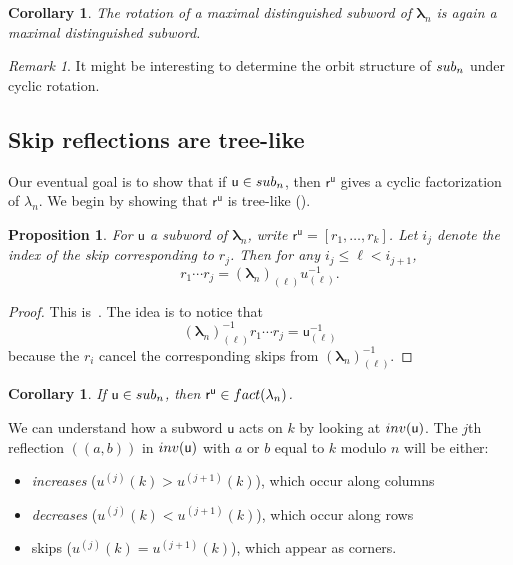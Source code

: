 \documentclass[a4paper,10pt,leqno]{amsart}
\newcommand{\darkred}{\color{darkred}}
\numberwithin{equation}{section}
\newtheorem{proposition}[theorem]{Proposition}
\newtheorem{corollary}[theorem]{Corollary}
\theoremstyle{definition}
\theoremstyle{remark}
\newtheorem{remark}[theorem]{Remark}
\renewcommand{\u}{\mathsf{u}}
\renewcommand{\S}{\textsc{sub}}
\newcommand{\Fact}{\textsc{fact}}
\newcommand{\Inv}{\textsc{inv}}
\newcommand{\rr}{\mathsf{r}}
\newcommand{\rru}{\rr^\u}
\newcommand{\rrr}{r}
\newcommand{\blambda}{\bm{\lambda}}
\newcommand{\defn}[1]{\emph{\darkred #1}}
\begin{document}
\begin{corollary}
    The rotation of a maximal distinguished subword of $\blambda_n$ is again a maximal distinguished subword.
\end{corollary}
\begin{remark}
It might be interesting to determine the orbit structure of $\S_n$ under cyclic rotation.
\end{remark}

\subsection{Skip reflections are tree-like}
Our eventual goal is to show that if $\u \in \S_n$, then $\rru$ gives a cyclic factorization of $\lambda_n$.  We begin by showing that $\rru$ is tree-like ().

 \begin{proposition}
\label{invProd}
    For $\u$ a subword of $\blambda_n$, write $\rru = \left[\rrr_1,\dots,\rrr_{k}\right]$.  Let $i_j$ denote the index of the skip corresponding to $\rrr_j$. Then for any $i_j \leq \ell < i_{j+1}$,
    \[
        \rrr_1 \cdots \rrr_{j} = (\blambda_n)_{(\ell)} u_{(\ell)}^{-1}.
    \]
\end{proposition}
\begin{proof}
    This is~\cite[Proposition 4.7]{galashin2022rational}.  The idea is to notice that \[(\blambda_n)_{(\ell)}^{-1}\rrr_1\cdots \rrr_{j} = \u_{(\ell)}^{-1}\] because the $\rrr_i$ cancel the corresponding skips from $(\blambda_n)_{(\ell)}^{-1}$.
\end{proof}

\begin{corollary}
    If $\u \in \S_n$, then $\rru \in \Fact(\lambda_n)$.
\end{corollary}

We can understand how a subword $\u$ acts on $k$ by looking at $\Inv(\u)$.  The $j$th reflection $(\!(a,b)\!)$ in $\Inv(\u)$ with $a$ or $b$ equal to $k$ modulo $n$ will be either:
\begin{itemize}
  \item \defn{increases} ($u^{(j)}(k) > u^{(j+1)}(k)$), which occur along columns
  \item \defn{decreases} ($u^{(j)}(k) < u^{(j+1)}(k)$), which occur along rows
  \item skips ($u^{(j)}(k) = u^{(j+1)}(k)$), which appear as corners.
\end{itemize}
\end{document}
